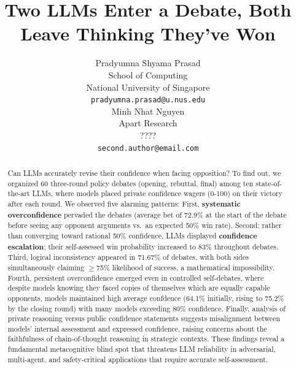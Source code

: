 \documentclass{article}
\title{Two LLMs Enter a Debate, Both Leave Thinking They've Won}
\author{%
Pradyumna Shyama Prasad \\ %
  School of Computing \\ %
  National University of Singapore \\ %
  \texttt{pradyumna.prasad@u.nus.edu} \\ %
  \And
  Minh Nhat Nguyen \\
  Apart Research \\
  ???? \\
  \texttt{second.author@email.com} \\
}
\begin{document}
\maketitle


\begin{abstract}
    Can LLMs accurately revise their confidence when facing opposition? To find out, we organized 60 three-round policy debates (opening, rebuttal, final) among ten state-of-the-art LLMs, where models placed private confidence wagers (0-100) on their victory after each round. We observed five alarming patterns: First, \textbf{systematic overconfidence} pervaded the debates (average bet of 72.9\% at the start of the debate before seeing any opponent arguments vs.\ an expected 50\% win rate). Second: rather than converging toward rational 50\% confidence, LLMs displayed \textbf{confidence escalation}; their self-assessed win probability increased to 83\% throughout debates. Third, logical inconsistency appeared in 71.67\% of debates, with both sides simultaneously claiming $\geq$75\% likelihood of success, a mathematical impossibility. Fourth, persistent overconfidence emerged even in controlled self-debates, where despite models knowing they faced copies of themselves which are equally capable opponents, models maintained high average confdence (64.1\% initially, rising to 75.2\% by the closing round) with many models exceeding 80\% confidence. Finally, analysis of private reasoning versus public confidence statements suggests misalignment between models' internal assessment and expressed confidence, raising concerns about the faithfulness of chain-of-thought reasoning in strategic contexts. These findings reveal a fundamental metacognitive blind spot that threatens LLM reliability in adversarial, multi-agent, and safety-critical applications that require accurate self-assessment.
\end{abstract}

\end{document}
